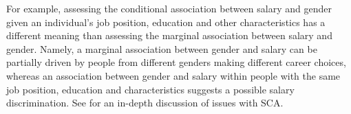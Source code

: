 \documentclass[pdflatex,sn-mathphys-num]{sn-jnl}%
\theoremstyle{thmstyleone}%
\theoremstyle{thmstyletwo}%
\theoremstyle{thmstylethree}%
\newcommand{\david}[1]{{\small{\color{blue} \sf $\heartsuit$ [David: #1]}}}
\newcommand{\paul}[1]{{\small{\color{green} \sf $\spadesuit$ Paul: #1}}}
\begin{document}
For example, assessing the conditional association between salary and gender given an individual's job position, education and other characteristics has a different meaning than assessing the marginal association between salary and gender. Namely, a marginal association between gender and salary can be partially driven by people from different genders making different career choices, whereas an association between gender and salary within people with the same job position, education and characteristics suggests a possible salary discrimination. %
See \cite{semken:2022} for an in-depth discussion of issues with SCA.
\end{document}
